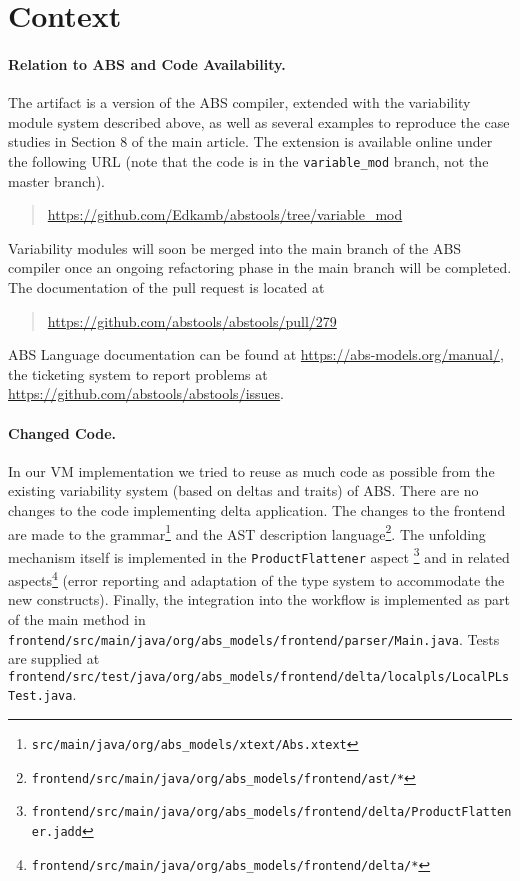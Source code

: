 \documentclass[runningheads]{llncs}
\begin{document}
\section{Context}

\paragraph{Relation to ABS and Code Availability.}
The artifact is a version of the ABS compiler, extended with the variability module system described above, as well as several examples to reproduce the case studies in Section 8 of the main article. The extension is available online under the following URL (note that the code is in the \texttt{variable\_mod} branch, not the master branch).
\begin{quote}
\url{https://github.com/Edkamb/abstools/tree/variable_mod}
\end{quote}

Variability modules will soon be merged into the main branch of the ABS compiler once an ongoing refactoring phase in the main branch will be completed.
The documentation of the pull request is located at
\begin{quote}
\url{https://github.com/abstools/abstools/pull/279}
\end{quote}

ABS Language documentation can be found at \url{https://abs-models.org/manual/}, the ticketing system to report problems at \url{https://github.com/abstools/abstools/issues}. 

\paragraph{Changed Code.}

In our VM implementation we tried to reuse as much code as possible from the existing variability system (based on deltas and traits) of ABS. 
There are no changes to the code implementing delta application. The changes to the frontend are made to the grammar\footnote{\texttt{src/main/java/org/abs\_models/xtext/Abs.xtext}}
and the AST description language\footnote{\texttt{frontend/src/main/java/org/abs\_models/frontend/ast/*}}. The unfolding mechanism itself is implemented in the \texttt{ProductFlattener} aspect \footnote{\texttt{frontend/src/main/java/org/abs\_models/frontend/delta/ProductFlattener.jadd}} and in related aspects\footnote{\texttt{frontend/src/main/java/org/abs\_models/frontend/delta/*}} (error reporting and adaptation of the type system to accommodate the new constructs).
Finally, the integration into the workflow is implemented as part of the main method in \texttt{frontend/src/main/java/org/abs\_models/frontend/parser/Main.java}.
Tests are supplied at \texttt{frontend/src/test/java/org/abs\_models/frontend/delta/localpls/LocalPLsTest.java}.
\end{document}
